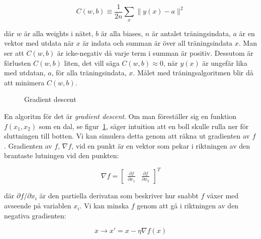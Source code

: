 \begin{equation}
	C(w, b) \equiv \frac{1}{2n} \displaystyle\sum_x \lVert y(x) - a \rVert^2
\end{equation}

där $ w $ är alla weights i nätet, $ b $ är alla biases,
$ n $ är antalet träningsindata, $ a $ är en vektor med utdata när $ x $ är indata
och summan är över all träningsindata $ x $.
Man ser att $ C(w, b) $ är icke-negativ då varje term i summan är positiv.
Dessutom är förlusten $ C(w, b) $ liten, det vill säga $ C(w, b) \approx 0 $,
när $ y(x) $ är ungefär lika med utdatan, $ a $, för alla träningsindata, $ x $.
Målet med träningsalgoritmen blir då att minimera $ C(w, b) $.

\begin{figure}
	\centering
	\caption{Gradient descent}
	\label{fig:descent}
\end{figure}

En algoritm för det är \emph{gradient descent}.
Om man föreställer sig en funktion $ f(x_1, x_2) $ som en dal,
se figur~\ref{fig:descent},
säger intuition att en boll skulle rulla ner för sluttningen till botten.
Vi kan simulera detta genom att räkna ut gradienten av $ f $.
Gradienten av $ f $, $ \nabla f $, vid en punkt är en vektor
som pekar i riktningen av den brantaste lutningen vid den punkten:

\begin{equation}
	\nabla f = \begin{bmatrix} \frac{\partial f}{\partial x_1} & \frac{\partial f}{\partial x_2} \end{bmatrix}^{T}
\end{equation}

där $ \partial f / \partial x_i $ är den partiella derivatan
som beskriver hur snabbt $ f $ växer med avseende på variablen $ x_i $.
Vi kan minska $ f $ genom att gå i riktningen av den negativa gradienten:

\begin{equation}
	x \rightarrow x' = x - \eta \nabla f(x)
\end{equation}


